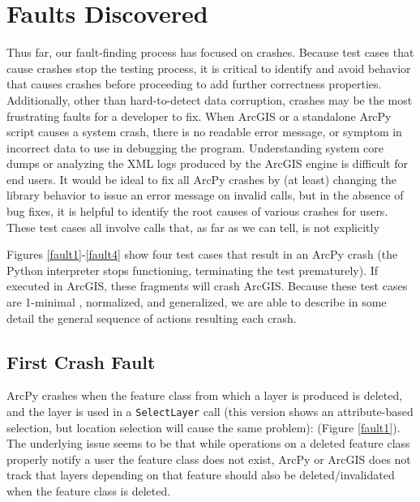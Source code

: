 \section{Faults Discovered}

Thus far, our fault-finding process has focused on crashes.  Because
test cases that cause crashes stop the testing process, it is critical
to identify and avoid behavior that causes crashes before proceeding
to add further correctness properties.  Additionally, other than
hard-to-detect data corruption, crashes may be the most frustrating
faults for a developer to fix.  When ArcGIS or a standalone ArcPy
script causes a system crash, there is no readable error message, or
symptom in incorrect data to use in debugging the program.
Understanding system core dumps or analyzing the XML logs produced by
the ArcGIS engine is difficult for end users.  It would be ideal to
fix all ArcPy crashes by (at least) changing the library behavior to
issue an error message on invalid calls, but in the absence of bug
fixes, it is helpful to identify the root causes of various crashes
for users.  These test cases all involve calls that, as far as we
can tell, is not explicitly 

Figures \ref{fault1}-\ref{fault4} show four test cases that result in
an ArcPy crash (the Python interpreter stops functioning, terminating
the test prematurely).  If executed in ArcGIS, these fragments will
crash ArcGIS.  Because these test cases are 1-minimal \cite{DD},
normalized, and generalized, we are able to describe in some detail
the general sequence of actions resulting each crash.

\subsection{First Crash Fault}

ArcPy crashes when the feature class from which a layer is produced is
deleted, and the layer is used in a {\tt SelectLayer} call (this
version shows an attribute-based selection, but location selection
will cause the same problem): (Figure \ref{fault1}).  The underlying issue seems to be that
while operations on a deleted feature class properly notify a user the
feature class does not exist, ArcPy or ArcGIS does not track that
layers depending on that feature should also be deleted/invalidated
when the feature class is deleted.

